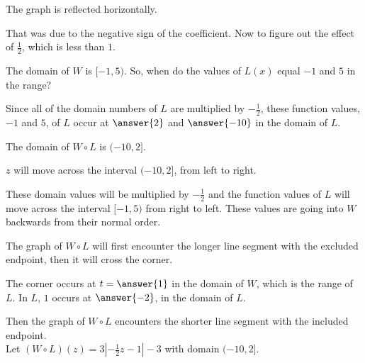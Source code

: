 \documentclass{ximera}
\begin{document}
The graph is reflected horizontally. 


That was due to the negative sign of the coefficient.  Now to figure out the effect of $\frac{1}{2}$, which is less than $1$.


The domain of $W$ is $[-1, 5)$.  So, when do the values of $L(x)$ equal $-1$ and $5$ in the range?  



\begin{question}

Since all of the domain numbers of $L$ are multiplied by $-\frac{1}{2}$, these function values, $-1$ and $5$, of $L$ occur at $\answer{2}$ and $\answer{-10}$ in the domain of $L$. 

\end{question}


The domain of $W \circ L$ is $(-10, 2]$. 



$z$ will move across the interval $(-10, 2]$, from left to right.  

These domain values will be multiplied by $-\frac{1}{2}$ and the function values of $L$ will move across the interval $[-1, 5)$ from right to left.  These values are going into $W$ backwards from their normal order.

The graph of $W \circ L$ will first encounter the longer line segment with the excluded endpoint, then it will cross the corner.  

\begin{question}

The corner occurs at $ t = \answer{1}$ in the domain of $W$, which is the range of $L$. In $L$, $1$ occurs at $\answer{-2}$, in the domain of $L$.  

\end{question}

Then the graph of $W \circ L$ encounters the shorter line segment with the included endpoint. \\





Let $(W \circ L)(z) = 3 |-\frac{1}{2}z-1| - 3$ with domain $(-10, 2]$.
\end{document}
